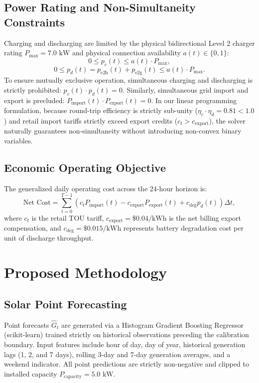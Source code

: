 \documentclass[conference]{IEEEtran}
\begin{document}
\subsection{Power Rating and Non-Simultaneity Constraints}
Charging and discharging are limited by the physical bidirectional Level 2 charger rating $P_{\max} = 7.0\text{ kW}$ and physical connection availability $a(t) \in \{0, 1\}$:
\begin{equation}
0 \le p_c(t) \le a(t) \cdot P_{\max},
\end{equation}
\begin{equation}
0 \le p_d(t) = p_{\text{e2h}}(t) + p_{\text{e2g}}(t) \le a(t) \cdot P_{\max}.
\end{equation}
To ensure mutually exclusive operation, simultaneous charging and discharging is strictly prohibited: $p_c(t) \cdot p_d(t) = 0$. Similarly, simultaneous grid import and export is precluded: $P_{\text{import}}(t) \cdot P_{\text{export}}(t) = 0$. In our linear programming formulation, because round-trip efficiency is strictly sub-unity ($\eta_c \cdot \eta_d = 0.81 < 1.0$) and retail import tariffs strictly exceed export credits ($c_t > c_{\text{export}}$), the solver naturally guarantees non-simultaneity without introducing non-convex binary variables.

\subsection{Economic Operating Objective}
The generalized daily operating cost across the 24-hour horizon is:
\begin{equation}
\text{Net Cost} = \sum_{t=0}^{T-1} \left( c_t P_{\text{import}}(t) - c_{\text{export}} P_{\text{export}}(t) + c_{\text{deg}} p_d(t) \right) \Delta t,
\end{equation}
where $c_t$ is the retail TOU tariff, $c_{\text{export}} = \$0.04/\text{kWh}$ is the net billing export compensation, and $c_{\text{deg}} = \$0.015/\text{kWh}$ represents battery degradation cost per unit of discharge throughput.

\section{Proposed Methodology}

\subsection{Solar Point Forecasting}
Point forecasts $\hat{G}_t$ are generated via a Histogram Gradient Boosting Regressor (scikit-learn) trained strictly on historical observations preceding the calibration boundary. Input features include hour of day, day of year, historical generation lags (1, 2, and 7 days), rolling 3-day and 7-day generation averages, and a weekend indicator. All point predictions are strictly non-negative and clipped to installed capacity $P_{\text{capacity}} = 5.0\text{ kW}$.
\end{document}
